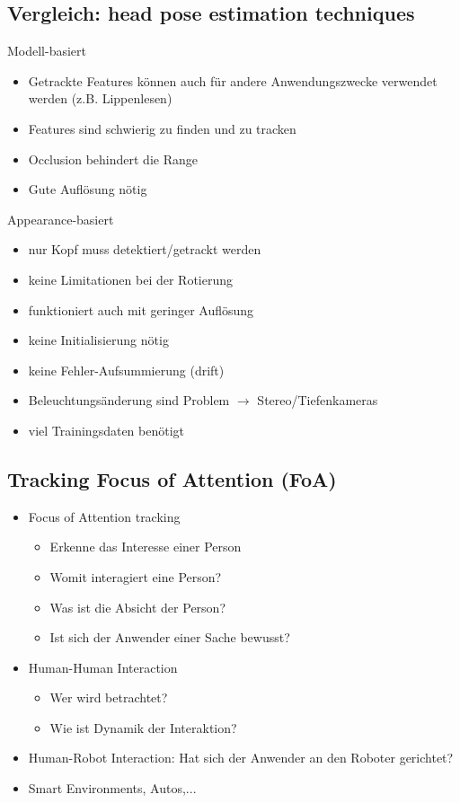 \documentclass[paper=a4, fontsize=11pt]{scrartcl} %
\numberwithin{equation}{section} %
\numberwithin{figure}{section} %
\numberwithin{table}{section} %
\begin{document}
\subsection{Vergleich: head pose estimation techniques}

\begin{minipage}{0.35\textwidth}
Modell-basiert
\begin{itemize}
\item Getrackte Features können auch für andere Anwendungszwecke verwendet werden (z.B. Lippenlesen)
\item Features sind schwierig zu finden und zu tracken
\item Occlusion behindert die Range
\item Gute Auflösung nötig
\end{itemize}
\end{minipage} \hfill
\begin{minipage}{0.6\textwidth}
Appearance-basiert
\begin{itemize}
\item nur Kopf muss detektiert/getrackt werden
\item keine Limitationen bei der Rotierung
\item funktioniert auch mit geringer Auflösung
\item keine Initialisierung nötig
\item keine Fehler-Aufsummierung (drift)
\item Beleuchtungsänderung sind Problem $\rightarrow$ Stereo/Tiefenkameras
\item viel Trainingsdaten benötigt
\end{itemize}
\end{minipage}

\subsection{Tracking Focus of Attention (FoA)}

\begin{itemize}
\item Focus of Attention tracking
\begin{itemize}
\item Erkenne das Interesse einer Person
\item Womit interagiert eine Person?
\item Was ist die Absicht der Person?
\item Ist sich der Anwender einer Sache bewusst?
\end{itemize}
\item Human-Human Interaction
\begin{itemize}
\item Wer wird betrachtet?
\item Wie ist Dynamik der Interaktion?
\end{itemize}
\item Human-Robot Interaction: Hat sich der Anwender an den Roboter gerichtet?
\item Smart Environments, Autos,...
\end{itemize}
\end{document}
